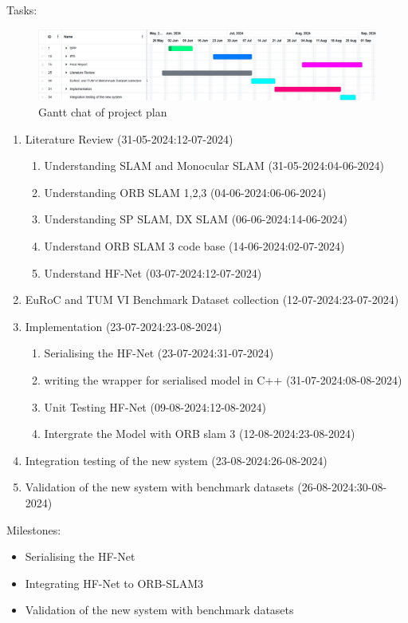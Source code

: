 \documentclass[a4paper,12pt]{article}
\begin{document}
\begin{spacing}{1}
    Tasks:
    \begin{figure}[hbt!]
        \centering
        \includegraphics[width=\textwidth,height=\textheight,keepaspectratio]{Images/project plan gantt.png}
        \caption{Gantt chat of project plan}
        \label{fig:Gantt chat of project plan}
    \end{figure}
    \begin{enumerate}
        \item Literature Review	(31-05-2024:12-07-2024)
        \begin{enumerate}
            \item Understanding SLAM and Monocular SLAM	(31-05-2024:04-06-2024)
            \item Understanding ORB SLAM 1,2,3	(04-06-2024:06-06-2024)
            \item Understanding SP SLAM, DX SLAM (06-06-2024:14-06-2024)
            \item Understand ORB SLAM 3 code base (14-06-2024:02-07-2024)
            \item Understand HF-Net	(03-07-2024:12-07-2024)
        \end{enumerate}
        \item EuRoC and TUM VI Benchmark Dataset collection	(12-07-2024:23-07-2024)
        \item Implementation (23-07-2024:23-08-2024)
        \begin{enumerate}
            \item Serialising the HF-Net (23-07-2024:31-07-2024)
            \item writing the wrapper for serialised model in C++ (31-07-2024:08-08-2024)
            \item Unit Testing HF-Net (09-08-2024:12-08-2024)
            \item Intergrate the Model with ORB slam 3 (12-08-2024:23-08-2024)
        \end{enumerate}
        \item Integration testing of the new system	(23-08-2024:26-08-2024)
        \item Validation of the new system with benchmark datasets (26-08-2024:30-08-2024)
    \end{enumerate}
    Milestones:
    \begin{itemize}
        \item Serialising the HF-Net
        \item Integrating HF-Net to ORB-SLAM3
        \item Validation of the new system with benchmark datasets
    \end{itemize}
\end{spacing}

\singlespacing
\printbibliography
\end{document}
